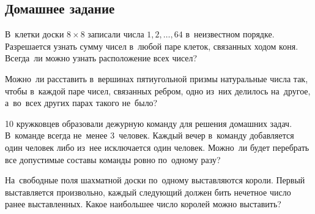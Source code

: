 

\subsection*{Домашнее задание}



\begin{problems}

\item
В~клетки доски $8 \times 8$ записали числа $1, 2, \ldots, 64$ в~неизвестном
порядке.
Разрешается узнать сумму чисел в~любой паре клеток, связанных ходом коня.
Всегда~ли можно узнать расположение всех чисел?

\item
Можно~ли расставить в~вершинах пятиугольной призмы натуральные числа так, чтобы
в~каждой паре чисел, связанных ребром, одно из~них делилось на~другое,
а~во~всех других парах такого не~было?

\item
10 кружковцев образовали дежурную команду для решения домашних задач.
В~команде всегда не~менее 3~человек.
Каждый вечер в~команду добавляется один человек либо из~нее исключается один
человек.
Можно~ли будет перебрать все допустимые составы команды ровно по~одному разу?

\item
На~свободные поля шахматной доски по~одному выставляются короли.
Первый выставляется произвольно, каждый следующий должен бить нечетное число
ранее выставленных.
Какое наибольшее число королей можно выставить?

\end{problems}

